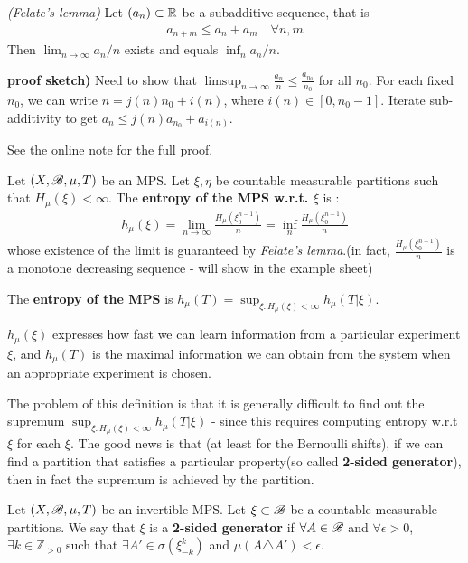 \documentclass[10pt,a4paper]{report}
\newenvironment{proof}
{\begin{changemargin}{1cm}{0.5cm} 
	}%
	{\end{changemargin}
}
\begin{document}
\lem \emph{(Felate's lemma)} Let $(a_n)\subset \mathbb{R}$ be a subadditive sequence, that is
\begin{align*}
a_{n+m} \leq a_n + a_m \quad \forall n,m
\end{align*}
Then $\lim_{n\rightarrow \infty} a_n/n$ exists and equals $\inf_{n} a_n /n $.
\begin{proof}
\textbf{proof sketch)} Need to show that $\limsup_{n\rightarrow \infty} \frac{a_n}{n} \leq \frac{a_{n_0}}{n_0}$ for all $n_0$. For each fixed $n_0$, we can write $n = j(n)n_0 + i(n)$, where $i(n) \in [0,n_0-1]$. Iterate sub-additivity to get $a_n \leq j(n) a_{n_0} + a_{i(n)}$.

\quad See the online note for the full proof.
\end{proof}
\s

 Let $(X,\mathscr{B}, \mu, T)$ be an MPS. Let $\xi, \eta$ be countable measurable partitions such that $H_{\mu}(\xi) < \infty$. The \textbf{entropy of the MPS w.r.t. $\xi$} is :
\begin{align*}
h_{\mu} (\xi) = \lim_{n\rightarrow \infty} \frac{H_{\mu}(\xi_0^{n-1})}{n} = \inf_n \frac{H_{\mu}(\xi_0^{n-1})}{n}
\end{align*}
whose existence of the limit is guaranteed by \emph{Felate's lemma}.(in fact, $\frac{H_{\mu}(\xi_0^{n-1})}{n}$ is a monotone decreasing sequence - will show in the example sheet)

\quad The \textbf{entropy of the MPS} is $h_{\mu}(T) = \sup_{\xi : H_{\mu}(\xi)<\infty} h_{\mu}(T|\xi)$.
\s

$h_{\mu} (\xi)$ expresses how fast we can learn information from a particular experiment $\xi$, and $h_{\mu}(T)$ is the maximal information we can obtain from the system when an appropriate experiment is chosen.
\s

The problem of this definition is that it is generally difficult to find out the supremum $\sup_{\xi : H_{\mu}(\xi)<\infty} h_{\mu}(T|\xi)$ - since this requires computing entropy w.r.t $\xi$ for each $\xi$. The good news is that (at least for the Bernoulli shifts), if we can find a partition that satisfies a particular property(so called \textbf{2-sided generator}), then in fact the supremum is achieved by the partition.
\s

 Let $(X,\mathscr{B}, \mu, T)$ be an invertible MPS. Let $\xi \subset \mathscr{B}$ be a countable measurable partitions. We say that $\xi$ is a \textbf{2-sided generator} if $\forall A\in \mathscr{B}$ and $\forall \epsilon >0$, $\exists k\in \mathbb{Z}_{>0}$ such that $\exists A'\in \sigma( \xi^k_{-k} )$ and $\mu(A \triangle A') <\epsilon$.
\s
\end{document}
